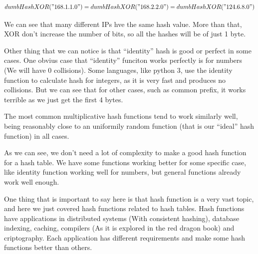 \[ dumbHashXOR("168.1.1.0") = dumbHashXOR("168.2.2.0") = dumbHashXOR("124.6.8.0") \]

We can see that many different IPs hve the same hash value. More than that, XOR don't increase the number of bits, so all the hashes will be of just 1 byte.

Other thing that we can notice is that ``identity'' hash is good or perfect in some cases. One obvius case that ``identity'' funciton works perfectly is for numbers (We will have 0 collisions). Some languages, like python 3, use the identity function to calculate hash for integers, as it is very fast and produces no collisions. But we can see that for other cases, such as common prefix, it works terrible as we just get the first 4 bytes.

The most common multiplicative hash functions tend to work similarly well, being reasonably close to an uniformily random function (that is our ``ideal'' hash function) in all cases.

As we can see, we don't need a lot of complexity to make a good hash function for a hash table. We have some functions working better for some specific case, like identity function working well for numbers, but general functions already work well enough.

One thing that is important to say here is that hash function is a very vast topic, and here we just covered hash functions related to hash tables. Hash functions have applications in distributed systems (With consistent hashing), database indexing, caching, compilers (As it is explored in the red dragon book) and criptography. Each application has different requirements and make some hash functions better than others.